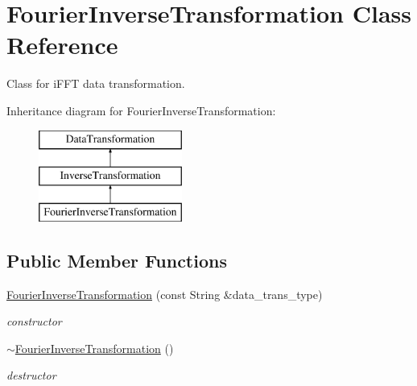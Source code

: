 \section{Fourier\+Inverse\+Transformation Class Reference}
\label{classPecos_1_1FourierInverseTransformation}


Class for i\+F\+FT data transformation.  


Inheritance diagram for Fourier\+Inverse\+Transformation\+:\begin{figure}[H]
\begin{center}
\leavevmode
\includegraphics[height=3.000000cm]{classPecos_1_1FourierInverseTransformation}
\end{center}
\end{figure}
\subsection*{Public Member Functions}
\begin{DoxyCompactItemize}
\item 
\hyperlink{classPecos_1_1FourierInverseTransformation_afde642f63e26faafbe247b43d85c808a}{Fourier\+Inverse\+Transformation} (const String \&data\+\_\+trans\+\_\+type)\label{classPecos_1_1FourierInverseTransformation_afde642f63e26faafbe247b43d85c808a}

\begin{DoxyCompactList}\small\item\em constructor \end{DoxyCompactList}\item 
\hyperlink{classPecos_1_1FourierInverseTransformation_a92f432dd2b7c6c5d31b64ddaf0f20fc2}{$\sim$\+Fourier\+Inverse\+Transformation} ()\label{classPecos_1_1FourierInverseTransformation_a92f432dd2b7c6c5d31b64ddaf0f20fc2}

\begin{DoxyCompactList}\small\item\em destructor \end{DoxyCompactList}\end{DoxyCompactItemize}
